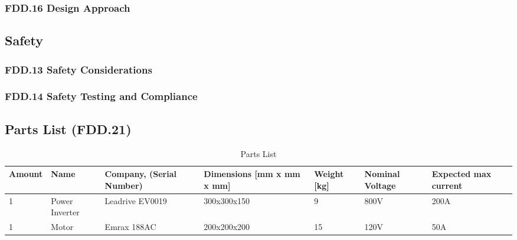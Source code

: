 \subsubsection{FDD.16 Design Approach}
 
\subsection{Safety}
\subsubsection{FDD.13 Safety Considerations}
 
\subsubsection{FDD.14 Safety Testing and Compliance}
 
\subsection{Parts List (FDD.21)}

\begin{table}[h]
    \centering
    \caption{Parts List}
    \begin{tabular}{|p{0.7cm}|p{4cm}|p{4cm}|p{3cm}|p{0.7cm}|p{1cm}|p{1cm}|}
        \hline
        \textbf{Amount} & \textbf{Name} & \textbf{Company, (Serial Number)} & \textbf{Dimensions [mm x mm x mm]} & \textbf{Weight [kg]} & \textbf{Nominal Voltage} & \textbf{Expected max current} \\
        \hline
        1 & Power Inverter & Leadrive EV0019 & 300x300x150 & 9 & 800V & 200A \\
        \hline
        1 & Motor & Emrax 188AC & 200x200x200 & 15 & 120V & 50A \\
        \hline

    \end{tabular}
\end{table}


\newpage
